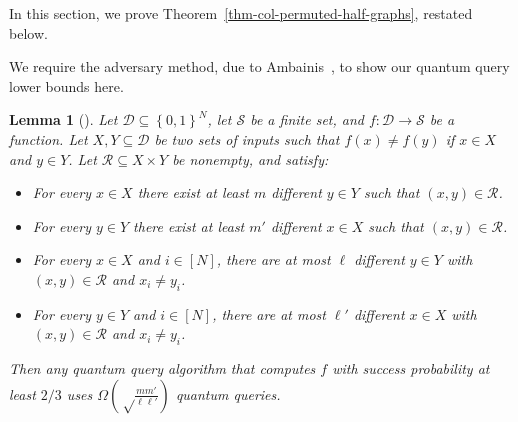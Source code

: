 \documentclass[11pt]{article}
\newcommand{\cD}{\mathcal{D}}
\newcommand{\cR}{\mathcal{R}}
\newcommand{\cS}{\mathcal{S}}
\newcommand{\set}[1]{\left\{ #1 \right\}}
\newcommand{\rbra}[1]{\left(#1\right)}
\newcommand{\zone}{\set{0,1}}
\newtheorem{lemma}[theorem]{Lemma}
\begin{document}
In this section, we prove Theorem~\ref{thm-col-permuted-half-graphs}, restated below.
\mainResultColPermutedHalfGraphs*

We require the adversary method, due to Ambainis~\cite{Amb02}, to show our quantum query lower bounds here.
\begin{lemma}[\cite{Amb02}]\label{lem:adversary}
    Let $\cD \subseteq \zone^N$, let $\cS$ be a finite set, and $f : \cD \to \cS$ be a function. Let $X, Y \subseteq \cD$ be two sets of inputs such that $f(x) \neq f(y)$ if $x \in X$ and $y \in Y$. Let $\cR \subseteq X \times Y$ be nonempty, and satisfy:
    \begin{itemize}
        \item For every $x \in X$ there exist at least $m$ different $y \in Y$ such that $(x, y) \in \cR$.
        \item For every $y \in Y$ there exist at least $m'$ different $x \in X$ such that $(x, y) \in \cR$.
        \item For every $x \in X$ and $i \in [N]$, there are at most $\ell$ different $y \in Y$ with $(x, y) \in \cR$ and $x_i \neq y_i$.
        \item For every $y \in Y$ and $i \in [N]$, there are at most $\ell'$ different $x \in X$ with $(x, y) \in \cR$ and $x_i \neq y_i$.
    \end{itemize}
    Then any quantum query algorithm that computes $f$ with success probability at least $2/3$ uses $\Omega\rbra{\sqrt\frac{m m'}{\ell\ell'}}$ quantum queries.
\end{lemma}
\end{document}

